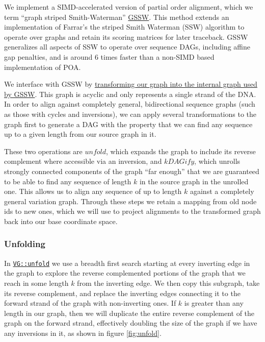 \documentclass[12pt]{article}
\begin{document}
We implement a SIMD-accelerated version of partial order alignment, which we term ``graph striped Smith-Waterman'' \href{https://github.com/ekg/gssw}{GSSW}.
This method extends an implementation \cite{zhao2013} of Farrar's the striped Smith Waterman (SSW) algorithm \cite{farrar2007} to operate over graphs and retain its scoring matrices for later traceback.
GSSW generalizes all aspects of SSW to operate over sequence DAGs, including affine gap penalties, and is around 6 times faster than a non-SIMD based implementation of POA.

We interface with GSSW by \href{https://github.com/vgteam/vg/blob/fbcb6e62/src/vg.cpp#L6461-L6532}{transforming our graph into the internal graph used by GSSW}.
This graph is acyclic and only represents a single strand of the DNA.
In order to align against completely general, bidirectional sequence graphs (such as those with cycles and inversions), we can apply several transformations to the graph first to generate a DAG with the property that we can find any sequence up to a given length from our source graph in it.

These two operations are $unfold$, which expands the graph to include its reverse complement where accessible via an inversion, and $kDAGify$, which unrolls strongly connected components of the graph ``far enough'' that we are guaranteed to be able to find any sequence of length $k$ in the source graph in the unrolled one.
This allows us to align any sequence of up to length $k$ against a completely general variation graph.
Through these steps we retain a mapping from old node ids to new ones, which we will use to project alignments to the transformed graph back into our base coordinate space.

\subsubsection{Unfolding}

In \href{https://github.com/vgteam/vg/blob/fbcb6e62/src/vg.cpp#L8289-L8400}{{\tt VG::unfold}} we use a breadth first search starting at every inverting edge in the graph to explore the reverse complemented portions of the graph that we reach in some length $k$ from the inverting edge.
We then copy this subgraph, take its reverse complement, and replace the inverting edges connecting it to the forward strand of the graph with non-inverting ones.
If $k$ is greater than any length in our graph, then we will duplicate the entire reverse complement of the graph on the forward strand, effectively doubling the size of the graph if we have any inversions in it, as shown in figure \ref{fig:unfold}.
\end{document}
